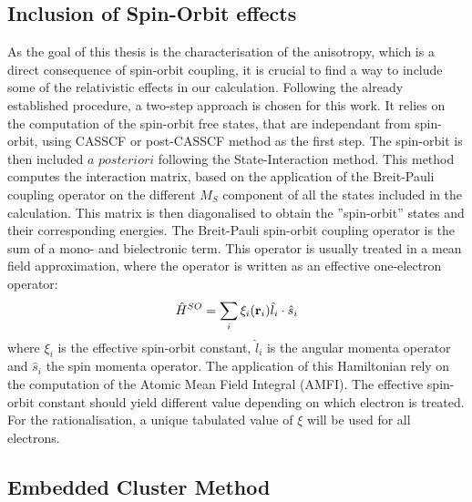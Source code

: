 \documentclass[12pt]{report}
\numberwithin{equation}{section}
\begin{document}
\subsection{Inclusion of Spin-Orbit effects}

As the goal of this thesis is the characterisation of the anisotropy, which is a direct consequence of spin-orbit coupling, it is crucial to find a way to include some of the relativistic effects in our calculation.
Following the already established procedure, a two-step approach is chosen for this work.
It relies on the computation of the spin-orbit free states, that are independant from spin-orbit, using CASSCF or post-CASSCF method as the first step.
The spin-orbit is then included $a$ $posteriori$ following the State-Interaction method.
This method computes the interaction matrix, based on the application of the Breit-Pauli coupling operator on the different $M_S$ component of all the states included in the calculation.
This matrix is then diagonalised to obtain the ''spin-orbit'' states and their corresponding energies.
The Breit-Pauli spin-orbit coupling operator is the sum of a mono- and bielectronic term.
This operator is usually treated in a mean field approximation, where the operator is written as an effective one-electron operator:
\begin{equation}
    \hat{H}^{SO}=\sum_{i} \xi_i(\vb r_i) \hat{l}_i \cdot \hat{s}_i
\end{equation}
where $\xi_i$ is the effective spin-orbit constant, $\hat{l}_i$ is the angular momenta operator and $\hat{s}_i$ the spin momenta operator.
The application of this Hamiltonian rely on the computation of the Atomic Mean Field Integral (AMFI).
The effective spin-orbit constant should yield different value depending on which electron is treated.
For the rationalisation, a unique tabulated value of $\xi$ will be used for all electrons.

\subsection{Embedded Cluster Method}
\end{document}
